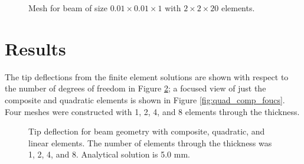 \documentclass[a4paper, 12pt]{article}
\begin{document}
\begin{figure}[H]
  \centering
  \caption{Mesh for beam of size $0.01 \times 0.01\times 1$ with $2\times 2\times 20$ elements.}
  \label{fig_mesh}
\end{figure}

\section{Results}
The tip deflections from the finite element solutions
are shown with respect to the number of degrees of freedom 
in Figure \ref{fig:convergence};
a focused view of just the composite and quadratic 
elements is shown in Figure \ref{fig:quad_comp_foucs}.
Four meshes were constructed with 1, 2, 4, and 8 elements
through the thickness.

\begin{figure}[H]
  \centering
  \caption{Tip deflection for beam geometry with composite, quadratic, and linear elements.
           The number of elements through the thickness was 1, 2, 4, and 8.
           Analytical solution is 5.0 mm.}
  \label{fig:convergence}
\end{figure}
\end{document}
